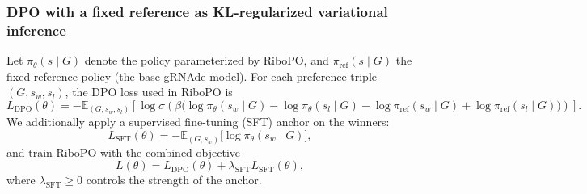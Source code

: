 {{\subsubsection{DPO with a fixed reference as KL-regularized variational inference}

Let $\pi_\theta(s \mid G)$ denote the policy parameterized by RiboPO,
and $\pi_{\text{ref}}(s \mid G)$ the fixed reference policy (the base gRNAde
model). For each preference triple $(G, s_w, s_l)$, the DPO loss used in
RiboPO is
\begin{equation}
    L_{\text{DPO}}(\theta)
    =
    -\mathbb{E}_{(G, s_w, s_l)}
    \left[
        \log \sigma\!\left(
            \beta
            \Big(
                \log \pi_\theta(s_w \mid G) - \log \pi_\theta(s_l \mid G)
                -\log \pi_{\text{ref}}(s_w \mid G) + \log \pi_{\text{ref}}(s_l \mid G)
            \Big)
        \right)
    \right].
    \label{eq:dpo-loss}
\end{equation}
We additionally apply a supervised fine-tuning (SFT) anchor on the winners:
\begin{equation}
    L_{\text{SFT}}(\theta)
    =
    - \mathbb{E}_{(G,s_w)} \bigl[ \log \pi_\theta(s_w \mid G) \bigr],
    \label{eq:sft-loss}
\end{equation}
and train RiboPO with the combined objective
\begin{equation}
    L(\theta) = L_{\text{DPO}}(\theta) + \lambda_{\text{SFT}} L_{\text{SFT}}(\theta),
    \label{eq:combined-loss}
\end{equation}
where $\lambda_{\text{SFT}} \geq 0$ controls the strength of the anchor.

}}
